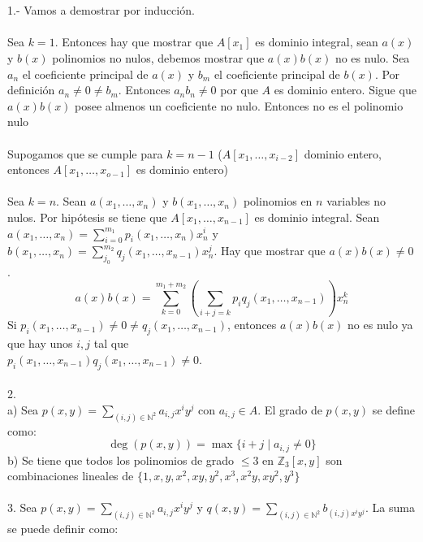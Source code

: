 \documentclass{article}
\begin{document}
\\
\\
1.- Vamos a demostrar por inducción.
\\
\\
Sea $k=1$. Entonces hay que mostrar que $A[x_{1}]$ es dominio integral, sean $a(x)$ y $b(x)$ polinomios no nulos, debemos mostrar que $a(x)b(x)$ no es nulo. Sea $a_{n}$ el coeficiente principal de $a(x)$ y $b_{m}$ el coeficiente principal de $b(x)$. Por definición $a_{n} \neq 0 \neq b_{m}$. Entonces $a_{n}b_{n} \neq 0$ por que $A$ es dominio entero. Sigue que $a(x)b(x)$ posee almenos un coeficiente no nulo. Entonces no es el polinomio nulo
\\
\\
Supogamos que se cumple para $k=n-1$ ($A[x_{1},\dots,x_{i-2}]$ dominio entero, entonces $A[x_{1},\dots,x_{o-1}]$ es dominio entero)
\\
\\
Sea $k=n$. Sean $a(x_{1},\dots,x_{n})$ y $b(x_{1},\dots,x_{n})$ polinomios en $n$ variables no nulos. Por hipótesis se tiene que $A[x_{1},\dots,x_{n-1}]$ es dominio integral. Sean $a(x_{1},\dots,x_{n})=\sum_{i=0}^{m_{1}}p_{i}(x_{1},\dots,x_{n})x_{n}^{i}$ y $b(x_{1},\dots,x_{n})=\sum_{j_0}^{m_{2}}q_{j}(x_{1},\dots,x_{n-1})x_{n}^{j}$. Hay que mostrar que $a(x)b(x) \neq 0$.
\begin{equation*}
    a(x)b(x) = \sum_{k=0}^{m_{1}+m_{2}} \left( \sum_{i+j=k} p_{i}q_{j}(x_{1},\dots,x_{n-1}) \right) x_{n}^{k}
\end{equation*}
Si $p_{i}(x_{1},\dots,x_{n-1}) \neq 0 \neq q_{j}(x_{1},\dots,x_{n-1})$, entonces $a(x)b(x)$ no es nulo 
ya que hay unos $i,j$ tal que 
\\
$p_{i}(x_{1},\dots,x_{n-1})q_{j}(x_{1},\dots,x_{n-1}) \neq 0$.
\\
\\
2. 
\\
a) Sea $p(x,y)=\sum_{(i,j)\in \mathbb{N}^{2}}a_{i,j}x^{i}y^{j}$ con $a_{i,j} \in A$. El grado de $p(x,y)$ se define como:
\begin{equation*}
    \deg(p(x, y)) = \max \{ i + j \mid a_{i,j} \neq 0 \}
\end{equation*}
b) Se tiene que todos los polinomios de grado $\leq 3$ en $\mathbb{Z}_{3}[x,y]$ son combinaciones lineales de $\{1,x,y,x^{2},xy,y^{2},x^3,x^2y,xy^{2},y^{3} \}$
\\
\\
3. Sea $p(x,y)=\sum_{(i,j) \in \mathbb{N}^{2}}a_{i,j}x^{i}y^{j}$ y $q(x,y)=\sum_{(i,j) \in \mathbb{N}^{2}}b_{(i,j)x^{i}y^{j}}$. La suma se puede definir como:
\end{document}
